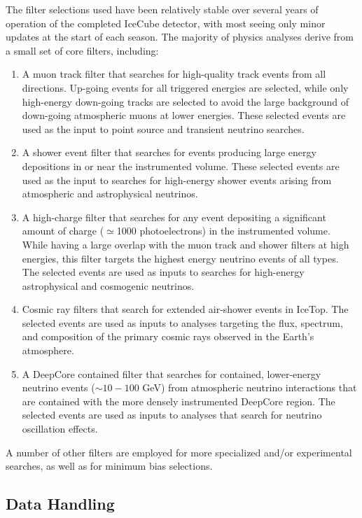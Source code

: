 The filter selections used have been relatively stable over several years
of operation of the completed IceCube detector, with most seeing only minor
updates at the 
start of each season.  The majority of physics analyses derive from a small
set of core filters, including:

\begin{enumerate}
\item A muon track filter that searches for high-quality track events from all
  directions.  Up-going events for all triggered energies are selected,
  while only high-energy 
  down-going tracks are selected to avoid the large background of
  down-going atmospheric muons at lower energies.  These selected events
  are used as the input to point source and transient neutrino searches.
\item A shower event filter that searches for events producing large energy
  depositions in or near the instrumented volume.  These selected events are
  used as the input to searches for high-energy shower events arising from
  atmospheric and astrophysical neutrinos.
\item A high-charge filter that searches for any event depositing a significant
  amount of charge ($\simeq$1000 photoelectrons) in the 
  instrumented volume.  While having a large overlap with the muon track
  and shower filters at high energies, this filter targets the highest
  energy neutrino events of all types. The selected events are used as
  inputs to searches for high-energy astrophysical and cosmogenic
  neutrinos.
\item Cosmic ray filters that search for extended air-shower events in
  IceTop.  The selected events are used as inputs to analyses 
  targeting the flux, spectrum, and composition of the primary cosmic rays
  observed in the Earth's atmosphere.
\item A DeepCore contained filter that searches for contained, lower-energy
  neutrino events ($\sim10-100$ GeV) from atmospheric neutrino interactions
  that are contained with the more densely instrumented DeepCore region.
  The selected events are used as inputs to analyses that search for
  neutrino oscillation effects.
\end{enumerate}

A number of other filters are employed for more specialized and/or
experimental searches, as well as for minimum bias selections.

\subsection{\label{sect:online_jade}Data Handling}


